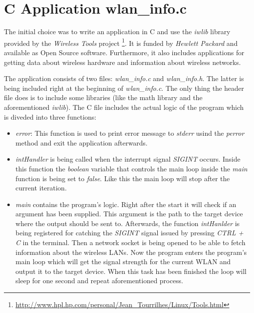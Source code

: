\section{C Application wlan\_info.c}

The initial choice was to write an application in C and use the \textit{iwlib} library provided by the \textit{Wireless Tools} project \footnote{\url{http://www.hpl.hp.com/personal/Jean_Tourrilhes/Linux/Tools.html}}. It is funded by \textit{Hewlett Packard} and available as Open Source software. Furthermore, it also includes applications for getting data about wireless hardware and information about wireless networks.

The application consists of two files: \textit{wlan\_info.c} and \textit{wlan\_info.h}. The latter is being included right at the beginning of \textit{wlan\_info.c}. The only thing the header file does is to include some libraries (like the math library and the aforementioned \textit{iwlib}). The C file includes the actual logic of the program which is diveded into three functions: 

\begin{itemize}

\item \textit{error}: This function is used to print error message to \textit{stderr} usind the \textit{perror} method and exit the application afterwards.

\item \textit{intHandler} is being called when the interrupt signal \textit{SIGINT} occurs. Inside this function the \textit{boolean} variable that controls the main loop inside the \textit{main} function is being set to \textit{false}. Like this the main loop will stop after the current iteration.

\item \textit{main} contains the program's logic. Right after the start it will check if an argument has been supplied. This argument is the path to the target device where the output should be sent to. Afterwards, the function \textit{intHanlder} is being registered for catching the \textit{SIGINT} signal issued by pressing \textit{CTRL + C} in the terminal. Then a network socket is being opened to be able to fetch information about the wireless LANs. Now the program enters the program's main loop which will get the signal strength for the current WLAN and output it to the target device. When this task has been finished the loop will sleep for one second and repeat aforementioned process. 

\end{itemize}


